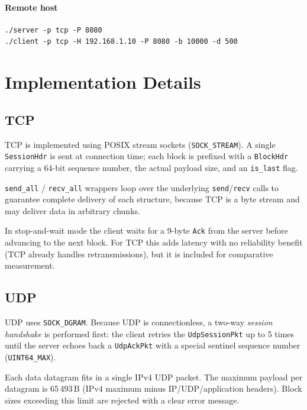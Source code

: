 \documentclass[12pt,a4paper]{article}
\begin{document}
\paragraph{Remote host}
\begin{lstlisting}
./server -p tcp -P 8080
./client -p tcp -H 192.168.1.10 -P 8080 -b 10000 -d 500
\end{lstlisting}

\section{Implementation Details}
\label{sec:impl}

\subsection{TCP}

TCP is implemented using POSIX stream sockets (\texttt{SOCK\_STREAM}).  A
single \texttt{SessionHdr} is sent at connection time; each block is
prefixed with a \texttt{BlockHdr} carrying a 64-bit sequence number, the
actual payload size, and an \texttt{is\_last} flag.

\texttt{send\_all} / \texttt{recv\_all} wrappers loop over the underlying
\texttt{send}/\texttt{recv} calls to guarantee complete delivery of each
structure, because TCP is a byte stream and may deliver data in arbitrary
chunks.

In stop-and-wait mode the client waits for a 9-byte \texttt{Ack} from the
server before advancing to the next block. For TCP this adds latency with
no reliability benefit (TCP already handles retransmissions), but it is
included for comparative measurement.

\subsection{UDP}

UDP uses \texttt{SOCK\_DGRAM}.  Because UDP is connectionless, a two-way
\emph{session handshake} is performed first: the client retries the
\texttt{UdpSessionPkt} up to 5 times until the server echoes back a
\texttt{UdpAckPkt} with a special sentinel sequence number
(\texttt{UINT64\_MAX}).

Each data datagram fits in a single IPv4 UDP packet. The maximum payload
per datagram is 65\,493\,B (IPv4 maximum minus IP/UDP/application headers).
Block sizes exceeding this limit are rejected with a clear error message.
\end{document}
